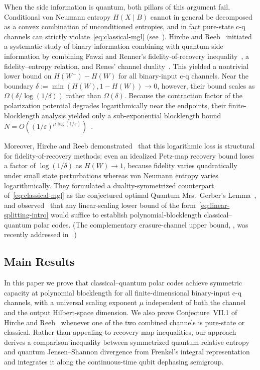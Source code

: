 \documentclass[10pt,a4paper]{article}
\numberwithin{equation}{section}
\theoremstyle{plain}
\theoremstyle{definition}
\theoremstyle{remark}
\begin{document}
When the side information is quantum, both pillars of this argument fail. Conditional von Neumann entropy $H(X \mid B)$ cannot in general be decomposed as a convex combination of unconditioned entropies, and in fact pure-state c-q channels can strictly violate~\eqref{eq:classical-mgl} (see~\cite{HircheReeb2018}). Hirche and Reeb~\cite{HircheReeb2018} initiated a systematic study of binary information combining with quantum side information by combining Fawzi and Renner's fidelity-of-recovery inequality~\cite{FawziRenner2015}, a fidelity--entropy relation, and Renes' channel duality~\cite{Renes2018}. This yielded a nontrivial lower bound on $H(W^-) - H(W)$ for all binary-input c-q channels. Near the boundary $\delta := \min(H(W), 1 - H(W)) \to 0$, however, their bound scales as $\Omega(\delta/\log(1/\delta))$ rather than $\Omega(\delta)$. Because the contraction factor of the polarization potential degrades logarithmically near the endpoints, their finite-blocklength analysis yielded only a sub-exponential blocklength bound $N = O((1/\varepsilon)^{\mu \log(1/\varepsilon)})$~\cite[Theorem~VIII.4]{HircheReeb2018}.

Moreover, Hirche and Reeb demonstrated~\cite[Remark~VI.4]{HircheReeb2018} that this logarithmic loss is structural for fidelity-of-recovery methods: even an idealized Petz-map recovery bound loses a factor of $\log(1/\delta)$ as $H(W) \to 1$, because fidelity varies quadratically under small state perturbations whereas von Neumann entropy varies logarithmically. They formulated a duality-symmetrized counterpart of~\eqref{eq:classical-mgl} as the conjectured optimal Quantum Mrs.\ Gerber's Lemma~\cite[Conjecture~VII.1]{HircheReeb2018}, and observed~\cite[Remark~VIII.5]{HircheReeb2018} that any linear-scaling lower bound of the form~\eqref{eq:linear-splitting-intro} would suffice to establish polynomial-blocklength classical--quantum polar codes. (The complementary erasure-channel upper bound, \cite[Conjecture~VII.2]{HircheReeb2018}, was recently addressed in~\cite{He2026}.)

\subsection{Main Results}

In this paper we prove that classical--quantum polar codes achieve symmetric capacity at polynomial blocklength for all finite-dimensional binary-input c-q channels, with a universal scaling exponent $\mu$ independent of both the channel and the output Hilbert-space dimension. We also prove Conjecture~VII.1 of Hirche and Reeb~\cite{HircheReeb2018} whenever one of the two combined channels is pure-state or classical. Rather than appealing to recovery-map inequalities, our approach derives a comparison inequality between symmetrized quantum relative entropy and quantum Jensen--Shannon divergence from Frenkel's integral representation~\cite{Frenkel2023} and integrates it along the continuous-time qubit dephasing semigroup.
\end{document}
